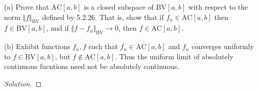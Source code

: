 \documentclass[10pt]{article}
\newcommand{\bv}{{\text{BV}}}
\newcommand{\ac}{{\text{AC}}}
\newenvironment{problem}[2][Problem]{\begin{trivlist}
\item[\hskip \labelsep {\bfseries #1}\hskip \labelsep {\bfseries #2.}]}{\end{trivlist}}
\begin{document}
\begin{problem}{6.1.10}

(a) Prove that $\ac[a,b]$ is a closed subspace of $\bv[a,b]$ with respect to the norm $\Vert f \Vert_\bv$ defined by 5.2.26. That is, show that if $f_n \in \ac[a,b]$ then $f \in \bv[a,b]$, and if $\Vert f - f_n \Vert_\bv \to 0$, then $f \in \ac[a,b]$.

(b) Exhibit functions $f_n, f$ such that $f_n \in \ac[a,b]$ and $f_n$ converges uniformly to $f \in \bv[a,b]$, but $f \not \in \ac[a,b]$. Thus the uniform limit of absolutely continuous fucntions need not be absolutely continuous.

\end{problem}
\begin{proof}[Solution]

\end{proof}

 
\end{document}
